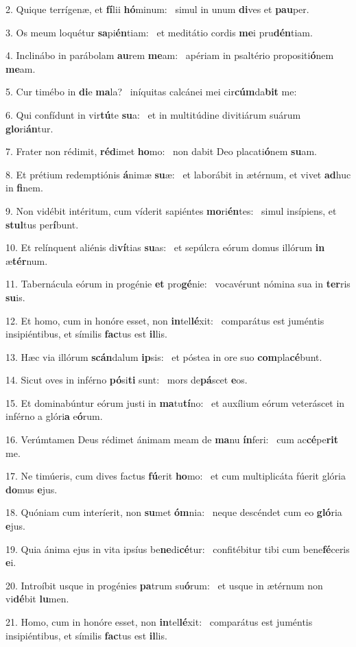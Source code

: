 2. Quique terrígenæ, et \textbf{fí}lii \textbf{hó}minum: \ast\  simul in unum \textbf{di}ves et \textbf{pau}per.\

3. Os meum loquétur \textbf{sa}pi\textbf{én}tiam: \ast\  et meditátio cordis \textbf{me}i pru\textbf{dén}tiam.\

4. Inclinábo in parábolam \textbf{au}rem \textbf{me}am: \ast\  apériam in psaltério propositi\textbf{ó}nem \textbf{me}am.\

5. Cur timébo in \textbf{di}e \textbf{ma}la? \ast\  iníquitas calcánei mei cir\textbf{cúm}da\textbf{bit} me:\

6. Qui confídunt in vir\textbf{tú}te \textbf{su}a: \ast\  et in multitúdine divitiárum suárum \textbf{glo}ri\textbf{án}tur.\

7. Frater non rédimit, \textbf{réd}imet \textbf{ho}mo: \ast\  non dabit Deo placati\textbf{ó}nem \textbf{su}am.\

8. Et prétium redemptiónis \textbf{á}nimæ \textbf{su}æ: \ast\  et laborábit in ætérnum, et vivet \textbf{ad}huc in \textbf{fi}nem.\

9. Non vidébit intéritum, cum víderit sapiéntes \textbf{mo}ri\textbf{én}tes: \ast\  simul insípiens, et \textbf{stul}tus per\textbf{í}bunt.\

10. Et relínquent aliénis di\textbf{ví}tias \textbf{su}as: \ast\  et sepúlcra eórum domus illórum \textbf{in} æ\textbf{tér}num.\

11. Tabernácula eórum in progénie \textbf{et} pro\textbf{gé}nie: \ast\  vocavérunt nómina sua in \textbf{ter}ris \textbf{su}is.\

12. Et homo, cum in honóre esset, non \textbf{in}tel\textbf{lé}xit: \ast\  comparátus est juméntis insipiéntibus, et símilis \textbf{fac}tus est \textbf{il}lis.\

13. Hæc via illórum \textbf{scán}dalum \textbf{ip}sis: \ast\  et póstea in ore suo \textbf{com}pla\textbf{cé}bunt.\

14. Sicut oves in inférno \textbf{pó}si\textbf{ti} sunt: \ast\  mors de\textbf{pá}scet \textbf{e}os.\

15. Et dominabúntur eórum justi in \textbf{ma}tu\textbf{tí}no: \ast\  et auxílium eórum veteráscet in inférno a glóri\textbf{a} e\textbf{ó}rum.\

16. Verúmtamen Deus rédimet ánimam meam de \textbf{ma}nu \textbf{ín}feri: \ast\  cum ac\textbf{cé}pe\textbf{rit} me.\

17. Ne timúeris, cum dives factus \textbf{fú}erit \textbf{ho}mo: \ast\  et cum multiplicáta fúerit glória \textbf{do}mus \textbf{e}jus.\

18. Quóniam cum interíerit, non \textbf{su}met \textbf{óm}nia: \ast\  neque descéndet cum eo \textbf{gló}ria \textbf{e}jus.\

19. Quia ánima ejus in vita ipsíus be\textbf{ne}di\textbf{cé}tur: \ast\  confitébitur tibi cum bene\textbf{fé}ceris \textbf{e}i.\

20. Introíbit usque in progénies \textbf{pa}trum su\textbf{ó}rum: \ast\  et usque in ætérnum non vi\textbf{dé}bit \textbf{lu}men.\

21. Homo, cum in honóre esset, non \textbf{in}tel\textbf{lé}xit: \ast\  comparátus est juméntis insipiéntibus, et símilis \textbf{fac}tus est \textbf{il}lis.\

